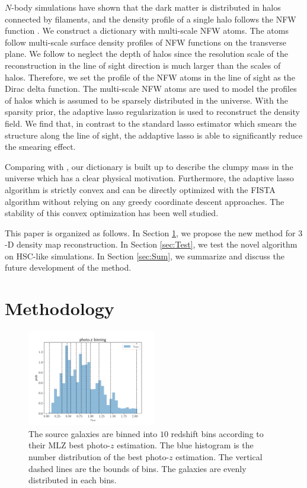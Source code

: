 \documentclass[twocolumn]{aastex62}
\begin{document}
$N$-body simulations have shown that the dark matter is distributed in halos connected by filaments, and the density
profile of a single halo follows the NFW function \citep{halo-NFW1997ApJ}.
We construct a dictionary with multi-scale NFW atoms.  The atoms follow multi-scale surface density profiles of NFW
functions \citep{haloModel-TJ2003-3pt} on the transverse plane. We follow \citet{LSS-massMap-Glimpse3D-Leonard2014}
to neglect the depth of halos since the resolution scale of the reconstruction in the line of sight direction is much
larger than the scales of halos. Therefore, we set the profile of the NFW atoms in the line of sight as the Dirac delta
function. The multi-scale NFW atoms are used to model the profiles of halos which is assumed to be sparsely distributed
in the universe. With the sparsity prior, the adaptive lasso regularization \citep{AdaLASSO-Zou2006} is used to reconstruct
the density field. We find that, in contrast to the standard lasso estimator which smears the structure along the line of sight,
the addaptive lasso is able to significantly reduce the smearing effect.

Comparing with \citet{LSS-massMap-Glimpse3D-Leonard2014}, our dictionary is built up to describe the clumpy mass
in the universe which has a clear physical motivation. Furthermore, the adaptive lasso algorithm is strictly convex and
can be directly optimized with the FISTA algorithm \citep{FISTA-Beck2009} without relying on any greedy coordinate
descent approaches.  The stability of this convex optimization has been well studied.

This paper is organized as follows.
In Section \ref{sec:Method}, we propose the new method for $3$-D density map reconstruction.
In Section \ref{sec:Test}, we test the novel algorithm on HSC-like simulations.
In Section \ref{sec:Sum}, we summarize and discuss the future development of the method.

\section{Methodology}
\label{sec:Method}

\begin{figure}[!t]
 \centering
 \includegraphics[width=0.5\textwidth]{photo-z_binning.pdf}
 \caption{The source galaxies are binned into $10$ redshift bins according to their MLZ best photo-$z$ estimation.
        The blue histogram is the number distribution of the best photo-$z$ estimation. The vertical dashed lines
        are the bounds of bins. The galaxies are evenly distributed in each bins.} \label{fig-bestpz}
\end{figure}
\end{document}
